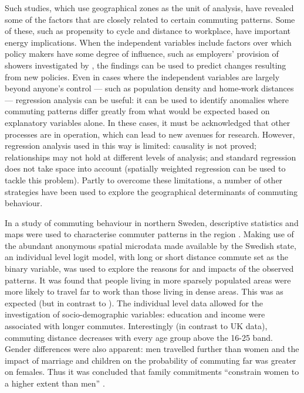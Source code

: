 \documentclass[a4paper, 11pt, twoside]{Thesis}
\begin{document}
Such studies, which use geographical zones as the unit of analysis,
have revealed some of the factors that are closely related to certain commuting
patterns. Some of these, such as propensity to cycle and distance to workplace,
have important energy implications. When the independent variables include
factors over which policy makers have some degree of influence, such as
employers' provision of showers investigated by \citet{Buehler2012}, the
findings can be used to predict changes resulting from new policies. Even in
cases where the independent variables are largely beyond anyone's control ---
such as population density and home-work distances ---
regression analysis can be useful: it can be used to identify anomalies
where commuting patterns differ greatly from what would be expected based on
explanatory variables alone. In these cases, it must be acknowledged that
other processes are in operation, which can lead to new avenues for research.
However, regression analysis used in this way is limited:
causality is not proved; relationships may not hold at different levels of
analysis; and standard regression does not take space into account
(spatially weighted regression can be used to tackle this problem).
Partly to overcome these limitations, a number of other strategies have
been used to explore the geographical determinants of commuting behaviour.

In a study of commuting behaviour in northern Sweden, descriptive statistics
and maps were used to characterise commuter patterns in the region \citep{Sandow2008}.
Making use of the abundant
anonymous spatial microdata made available by the Swedish state, an
individual level logit model, with long or short distance commute
set as the binary variable,
was used to explore the reasons for and impacts of the observed patterns.
It was found that people living in more sparsely populated areas
were more likely to travel far to work than those living in dense areas.
This was as expected (but in contrast to \citet{Titheridge2006}).
The individual level data allowed for the investigation of socio-demographic
variables: education and income were associated with longer commutes.
Interestingly (in contrast to UK data), commuting distance decreases
with every age group above the 16-25 band. Gender differences were also
apparent: men travelled further than women and the impact of marriage and
children on the probability of commuting far was greater on females. Thus
it was concluded that family
commitments ``constrain women to a higher extent than men''
\citep[p.~24]{Sandow2008}.
\end{document}
